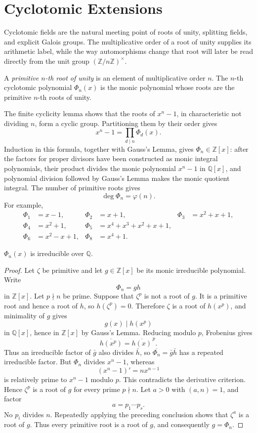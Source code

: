 \section{Cyclotomic Extensions}

Cyclotomic fields are the natural meeting point of roots of unity, splitting
fields, and explicit Galois groups.  The multiplicative order of a root of
unity supplies its arithmetic label, while the way automorphisms change that
root will later be read directly from the unit group
\((\mathbb Z/n\mathbb Z)^\times\).

\begin{definition}
A \emph{primitive \(n\)-th root of unity} is an element of multiplicative
order \(n\).  The \(n\)-th cyclotomic polynomial \(\Phi_n(x)\) is the monic
polynomial whose roots are the primitive \(n\)-th roots of unity.
\end{definition}
The finite cyclicity lemma shows that the roots of \(x^n-1\), in
characteristic not dividing \(n\), form a cyclic group.  Partitioning them
by their order gives
\[
x^n-1=\prod_{d\mid n}\Phi_d(x).
\]
Induction in this formula, together with Gauss's Lemma, gives
\(\Phi_n\in\mathbb Z[x]\): after the factors for proper divisors have been
constructed as monic integral polynomials, their product divides the monic
polynomial \(x^n-1\) in \(\mathbb Q[x]\), and polynomial division followed by
Gauss's Lemma makes the monic quotient integral.  The number of primitive
roots gives
\[
\deg\Phi_n=\varphi(n).
\]
For example,
\[
\begin{aligned}
\Phi_1&=x-1, & \Phi_2&=x+1, & \Phi_3&=x^2+x+1,\\
\Phi_4&=x^2+1, & \Phi_5&=x^4+x^3+x^2+x+1,\\
\Phi_6&=x^2-x+1, & \Phi_8&=x^4+1.
\end{aligned}
\]

\begin{theorem}
\(\Phi_n(x)\) is irreducible over \(\mathbb Q\).
\end{theorem}
\begin{proof}
Let \(\zeta\) be primitive and let \(g\in\mathbb Z[x]\) be its monic
irreducible polynomial.  Write
\[
\Phi_n=gh
\]
in \(\mathbb Z[x]\).  Let \(p\nmid n\) be prime.  Suppose that \(\zeta^p\)
is not a root of \(g\).  It is a primitive root and hence a root of \(h\),
so \(h(\zeta^p)=0\).  Therefore \(\zeta\) is a root of \(h(x^p)\), and
minimality of \(g\) gives
\[
g(x)\mid h(x^p)
\]
in \(\mathbb Q[x]\), hence in \(\mathbb Z[x]\) by Gauss's Lemma.  Reducing
modulo \(p\), Frobenius gives
\[
\overline{h(x^p)}=\overline{h(x)}^{\,p}.
\]
Thus an irreducible factor of \(\bar g\) also divides \(\bar h\), so
\(\overline{\Phi_n}=\bar g\bar h\) has a repeated irreducible factor.
But \(\Phi_n\) divides \(x^n-1\), whereas
\[
(x^n-1)'=nx^{n-1}
\]
is relatively prime to \(x^n-1\) modulo \(p\).  This contradicts the
derivative criterion.  Hence \(\zeta^p\) is a root of \(g\) for every prime
\(p\nmid n\).  Let \(a>0\) with \((a,n)=1\), and factor
\[
a=p_1\cdots p_s.
\]
No \(p_i\) divides \(n\).  Repeatedly applying the preceding conclusion
shows that \(\zeta^a\) is a root of \(g\).  Thus every primitive root is a
root of \(g\), and consequently \(g=\Phi_n\).
\end{proof}


